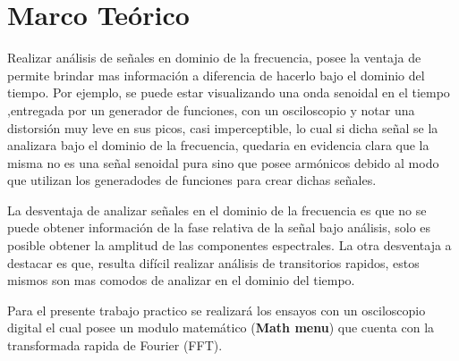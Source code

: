   \section{Marco Teórico}

    Realizar análisis de señales en dominio de la frecuencia, posee la ventaja de 
    permite brindar mas información a diferencia de hacerlo bajo el dominio del tiempo. 
    Por ejemplo, se puede estar visualizando una onda senoidal en el tiempo ,entregada 
    por un generador de funciones, con un osciloscopio y notar una distorsión muy leve 
    en sus picos, casi imperceptible, lo cual si dicha señal se la analizara bajo el 
    dominio de la frecuencia, quedaria en evidencia clara que la misma no es una señal 
    senoidal pura sino que posee armónicos debido al modo que utilizan los generadodes 
    de funciones para crear dichas señales.
    
    La desventaja de analizar señales en el 
    dominio de la frecuencia es que no se puede obtener información de la fase relativa de 
    la señal bajo análisis, solo es posible obtener la amplitud de las componentes
    espectrales. La otra desventaja a destacar es que, resulta difícil realizar análisis de 
    transitorios rapidos, estos mismos son mas comodos de analizar en el dominio del tiempo.
    
    Para el presente trabajo practico se realizará los ensayos con un osciloscopio digital 
    el cual posee un modulo matemático (\textbf{Math menu}) que cuenta con la transformada 
    rapida de Fourier (FFT). 

        
    





